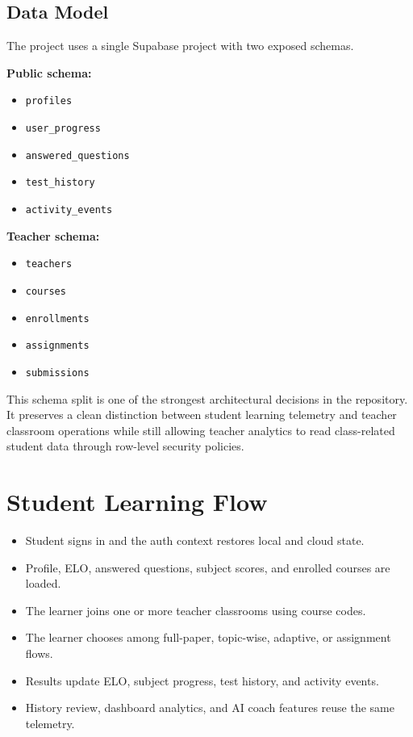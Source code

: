 \documentclass[10pt,twocolumn,a4paper]{article}
\newcommand{\tech}[1]{\texttt{#1}}
\begin{document}
\subsection{Data Model}
The project uses a single Supabase project with two exposed schemas.

\textbf{Public schema:}
\begin{itemize}
  \item \tech{profiles}
  \item \tech{user\_progress}
  \item \tech{answered\_questions}
  \item \tech{test\_history}
  \item \tech{activity\_events}
\end{itemize}

\textbf{Teacher schema:}
\begin{itemize}
  \item \tech{teachers}
  \item \tech{courses}
  \item \tech{enrollments}
  \item \tech{assignments}
  \item \tech{submissions}
\end{itemize}

This schema split is one of the strongest architectural decisions in the repository. It preserves a clean distinction between student learning telemetry and teacher classroom operations while still allowing teacher analytics to read class-related student data through row-level security policies.

\section{Student Learning Flow}
\begin{itemize}
  \item Student signs in and the auth context restores local and cloud state.
  \item Profile, ELO, answered questions, subject scores, and enrolled courses are loaded.
  \item The learner joins one or more teacher classrooms using course codes.
  \item The learner chooses among full-paper, topic-wise, adaptive, or assignment flows.
  \item Results update ELO, subject progress, test history, and activity events.
  \item History review, dashboard analytics, and AI coach features reuse the same telemetry.
\end{itemize}
\end{document}
